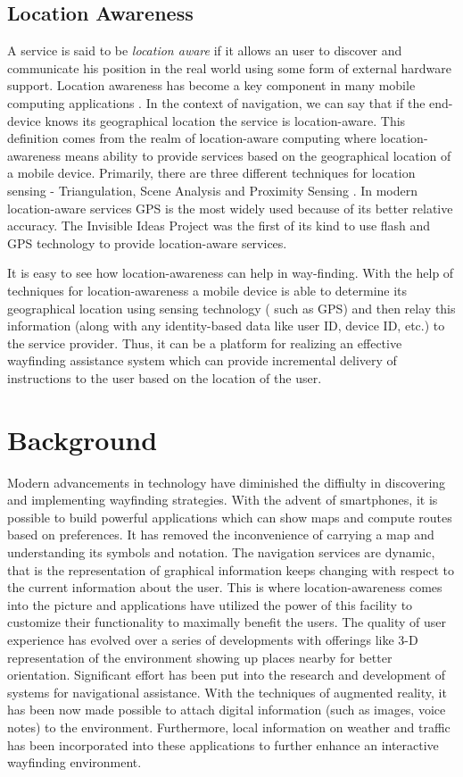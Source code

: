 \documentclass{iitkthesis}
\begin{document}
\subsection{Location Awareness}
A service is said to be \textit{location aware} if it allows an user to 
discover and communicate his position in the real world using some  
form of external hardware support. Location awareness has become 
a key component in many mobile computing applications \cite{parctab}. 
In the context of navigation, we can say that if the end-device knows its 
geographical location the service is location-aware. This definition 
comes from the realm of location-aware computing where location-awareness 
means ability to provide services based on the geographical location of a 
mobile device. Primarily, there are three different techniques for 
location sensing - Triangulation, Scene Analysis and Proximity Sensing 
\cite{hightower}. In modern location-aware services GPS is the 
most widely used because of its better relative accuracy. The Invisible 
Ideas Project \cite{perry} was the first of its kind to use flash and GPS 
technology to provide location-aware services.

It is easy to see how location-awareness can help in way-finding. 
With the help of techniques for location-awareness a mobile device is
able to determine its geographical location using sensing technology (
such as GPS) and then relay this information (along with any 
identity-based data like 
user ID, device ID, etc.) to the service provider. Thus, it can be a platform 
for realizing an effective wayfinding assistance system which can provide 
incremental delivery of instructions to the user based on the location of 
the user. 

\section{Background}
Modern advancements in technology have diminished the diffiulty 
in discovering and implementing wayfinding strategies. With the 
advent of smartphones, it is possible to build powerful 
applications which can show maps and compute routes based on preferences. 
It has removed the inconvenience of carrying a map and understanding its 
symbols and notation. The navigation services are dynamic, that is the 
representation of graphical information keeps changing with respect to 
the current information about the user. This is where location-awareness 
comes into the picture and applications have utilized the power of this 
facility to customize their functionality to maximally benefit the users. 
The quality of user experience has evolved over a series of developments 
with offerings like 3-D representation of the environment showing up 
places nearby for better orientation. Significant effort has been put 
into the research and development of systems for navigational 
assistance. With the techniques of augmented reality, it has been now 
made possible to attach digital information (such as images, voice notes) 
to the environment. Furthermore, local information on weather and traffic 
has been incorporated into these applications to further enhance an 
interactive wayfinding environment.
\end{document}
